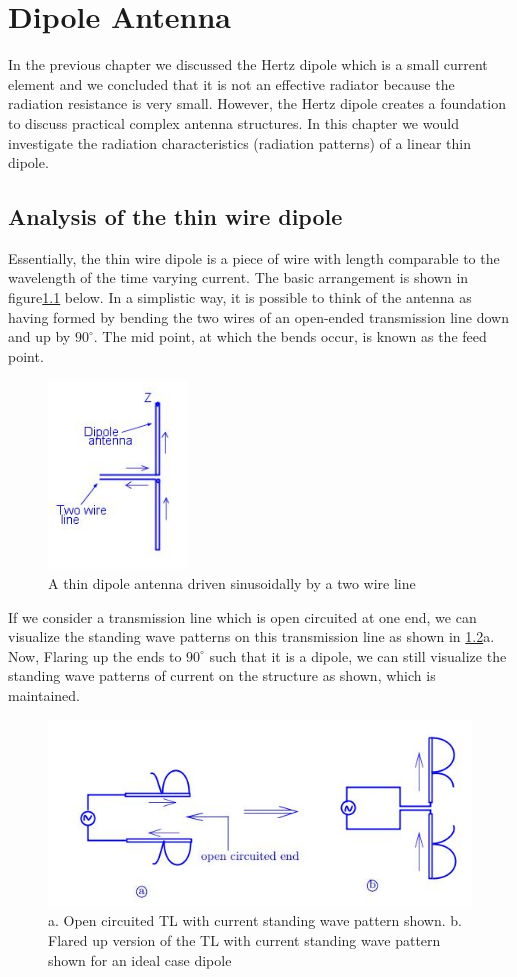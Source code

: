 \chapter{Dipole Antenna}
In the previous chapter we discussed the Hertz dipole which is a small current element and we concluded that it is not an effective radiator because the radiation resistance is very small. However, the Hertz dipole creates a foundation to discuss practical complex antenna structures. In this chapter we would investigate the radiation characteristics (radiation patterns) of a linear thin dipole. 

\section{Analysis of the thin wire dipole}
Essentially, the thin wire dipole is a piece of wire with length comparable to the wavelength of the time varying current. The basic arrangement is shown in figure\ref{figure1} below. In a simplistic way, it is possible to think of the antenna as having formed by bending the two wires of an open-ended transmission line down and up by $90^\circ$. The mid point, at which the bends occur, is known as the feed point. 
\begin{figure}[h]
\centering
\includegraphics[height=5cm]{./graphics/diagram5}
\caption{A thin dipole antenna driven sinusoidally by a two wire line}
\label{figure1}
\end{figure}

If we consider a transmission line which is open circuited at one end, we can visualize the standing wave patterns on this transmission line as shown in \ref{figure2}a. Now, Flaring up the ends to $90^\circ$ such that it is a dipole, we can still visualize the standing wave patterns of current on the structure as shown, which is maintained. 
\begin{figure}[h]
\centering
\includegraphics[width=1\linewidth]{./graphics/diagram6}
\caption{a. Open circuited TL with current standing wave pattern shown.           
 b. Flared up version of the TL with current standing wave pattern shown for an ideal case dipole}
\label{figure2}
\end{figure}

